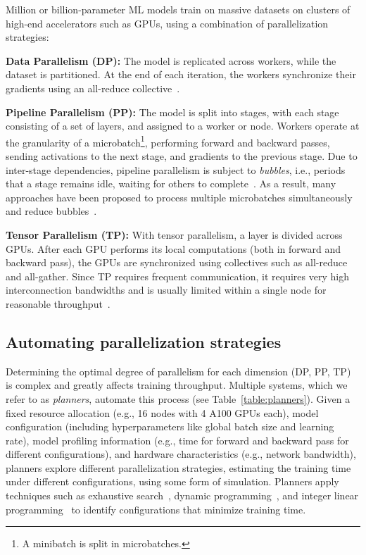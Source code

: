 Million or billion-parameter ML models train on massive datasets on clusters of high-end accelerators such as GPUs, using a combination of parallelization strategies:

\textbf{Data Parallelism (DP):} The model is replicated across workers, while the dataset is partitioned. At the end of each iteration, the workers synchronize their gradients using an all-reduce collective~\cite{Sapio21innetwork}.

\textbf{Pipeline Parallelism (PP):} The model is split into stages, with each stage consisting of a set of layers, and assigned to a worker or node. Workers operate at the granularity of a microbatch\footnote{A minibatch is split in microbatches.}, performing forward and backward passes, sending activations to the next stage, and gradients to the previous stage. Due to inter-stage dependencies, pipeline parallelism is subject to \textit{bubbles}, i.e., periods that a stage remains idle, waiting for others to complete~\cite{Huang19Gpipe}. As a result, many approaches have been proposed to process multiple microbatches simultaneously and reduce bubbles~\cite{Athlur22Varuna, Narayanan19Pipedream}.

\textbf{Tensor Parallelism (TP):} With tensor parallelism, a layer is divided across GPUs. After each GPU performs its local computations (both in forward and backward pass), the GPUs are synchronized using collectives such as all-reduce and all-gather. Since TP requires frequent communication, it requires very high interconnection bandwidths and is usually limited within a single node for reasonable throughput~\cite{shoeybi2020megatronlm}.  


\vspace{-0.1cm}
\subsection{Automating parallelization strategies}

Determining the optimal degree of parallelism for each dimension (DP, PP, TP) is complex and greatly affects training throughput. Multiple systems, which we refer to as \textit{planners}, automate this process (see Table~\ref{table:planners}). Given a fixed resource allocation (e.g., 16 nodes with 4 A100 GPUs each), model configuration (including hyperparameters like global batch size and learning rate), model profiling information (e.g., time for forward and backward pass for different configurations), and hardware characteristics (e.g., network bandwidth), planners explore different parallelization strategies, estimating the training time under different configurations, using some form of simulation. Planners apply techniques such as exhaustive search~\cite{Athlur22Varuna, Um24Metis}, dynamic programming~\cite{Tarnawski21Piper, li2022amp}, and integer linear programming~\cite{zheng2022alpa} to identify configurations that minimize training time.




